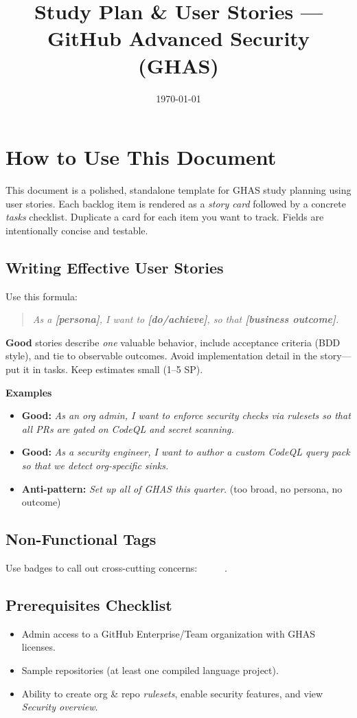 \documentclass[11pt,a4paper]{article}
\title{\textbf{Study Plan \& User Stories — GitHub Advanced Security (GHAS)}}
\author{}
\date{\today}
\begin{document}
\maketitle
\tableofcontents
\bigskip

\section{How to Use This Document}
This document is a polished, standalone template for GHAS study planning using user stories. Each backlog item is rendered as a \emph{story card} followed by a concrete \emph{tasks} checklist. Duplicate a card for each item you want to track. Fields are intentionally concise and testable.

\subsection*{Writing Effective User Stories}
Use this formula:
\begin{quote}
\textit{As a \textbf{[persona]}, I want to \textbf{[do/achieve]}, so that \textbf{[business outcome]}.}
\end{quote}
\textbf{Good} stories describe \emph{one} valuable behavior, include acceptance criteria (BDD style), and tie to observable outcomes. Avoid implementation detail in the story---put it in tasks. Keep estimates small (1--5 SP).

\textbf{Examples}
\begin{itemize}
  \item \textbf{Good:} \emph{As an org admin, I want to enforce security checks via rulesets so that all PRs are gated on CodeQL and secret scanning.}
  \item \textbf{Good:} \emph{As a security engineer, I want to author a custom CodeQL query pack so that we detect org-specific sinks.}
  \item \textbf{Anti-pattern:} \emph{Set up all of GHAS this quarter.} (too broad, no persona, no outcome)
\end{itemize}

\subsection*{Non-Functional Tags}
Use badges to call out cross-cutting concerns: \ \ \ \ \ .

\subsection*{Prerequisites Checklist}
\begin{itemize}
  \item Admin access to a GitHub Enterprise/Team organization with GHAS licenses.
  \item Sample repositories (at least one compiled language project).
  \item Ability to create org \& repo \emph{rulesets}, enable security features, and view \emph{Security overview}.
\end{itemize}
\end{document}
